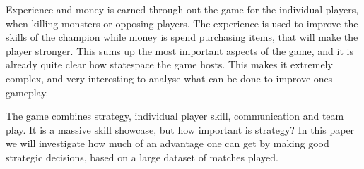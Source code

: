 Experience and money is earned through out the game for the individual players, when killing monsters or opposing players. The experience is used to improve the skills of the champion while money is spend purchasing items, that will make the player stronger. This sums up the most important aspects of the game, and it is already quite clear how statespace the game hosts. This makes it extremely complex, and very interesting to analyse what can be done to improve ones gameplay. 

The game combines strategy, individual player skill, communication and team play. It is a massive skill showcase, but how important is strategy? In this paper we will investigate how much of an advantage one can get by making good strategic decisions, based on a large dataset of matches played.


